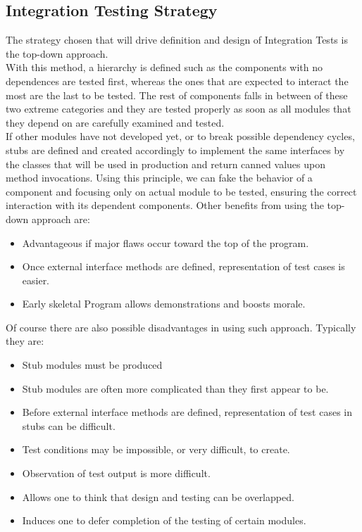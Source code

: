 \subsection{Integration Testing Strategy}
The strategy chosen that will drive definition and design of Integration Tests is the top-down approach. \\
With this method, a hierarchy is defined such as the components with no dependences are tested first, whereas the ones that are expected to interact the most are the last to be tested. The rest of components falls in between of these two extreme categories and they are tested properly as soon as all modules that they depend on are carefully examined and tested. \\
If other modules have not developed yet, or to break possible dependency cycles, stubs are defined and created accordingly to implement the same interfaces by the classes that will be used in production and return canned values upon method invocations. Using this principle, we can fake the behavior of a component and focusing only on actual module to be tested, ensuring the correct interaction with its dependent components.
Other benefits from using the top-down approach are:
\begin{itemize}
	\item Advantageous if major flaws occur toward the top of the program.
	\item Once external interface methods are defined, representation of test cases is easier.
	\item Early skeletal Program allows demonstrations and boosts morale.
\end{itemize}
Of course there are also possible disadvantages in using such approach. Typically they are:
\begin{itemize}
	\item Stub modules must be produced
	\item Stub modules are often more complicated than they first appear to be.
	\item Before external interface methods are defined, representation of test cases in stubs can be difficult.
	\item Test conditions may be impossible, or very difficult, to create.
	\item Observation of test output is more difficult.
	\item Allows one to think that design and testing can be overlapped.
	\item Induces one to defer completion of the testing of certain modules.
\end{itemize}
\break
